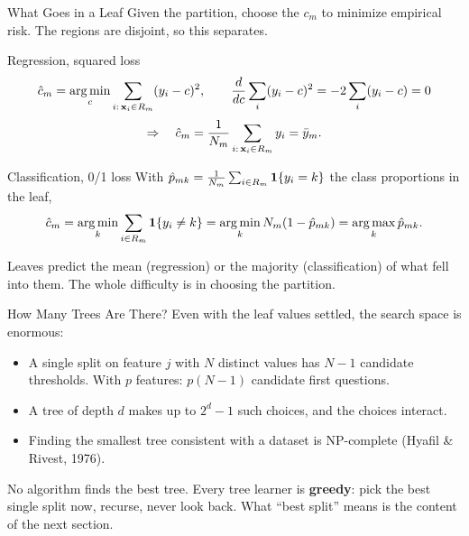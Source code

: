 \documentclass[11pt,aspectratio=169]{beamer}
\begin{document}
\begin{frame}{What Goes in a Leaf}\small
Given the partition, choose the $c_m$ to minimize empirical risk. The regions are disjoint, so this separates.
\begin{derivation}{Regression, squared loss}
\[
\hat c_m=\operatorname*{arg\,min}_c\sum_{i:\,\mathbf{x}_i\in R_m}(y_i-c)^2 ,\qquad
\frac{d}{dc}\sum_i(y_i-c)^2=-2\sum_i(y_i-c)=0
\]
\[
\Rightarrow\quad
\hat c_m=\frac{1}{N_m}\sum_{i:\,\mathbf{x}_i\in R_m}y_i=\bar y_m .
\]
\end{derivation}
\begin{derivation}{Classification, 0/1 loss}
With $\hat p_{mk}=\frac1{N_m}\sum_{i\in R_m}\mathbf{1}\!\left\{y_i=k\right\}$ the class proportions in the leaf,
\[
\hat c_m=\operatorname*{arg\,min}_k\sum_{i\in R_m}\mathbf{1}\!\left\{y_i\ne k\right\}=\operatorname*{arg\,min}_k N_m(1-\hat p_{mk})=\operatorname*{arg\,max}_k\hat p_{mk}.
\]
\end{derivation}
Leaves predict the mean (regression) or the majority (classification) of what fell into them.
The whole difficulty is in choosing the partition.
\end{frame}

\begin{frame}{How Many Trees Are There?}
Even with the leaf values settled, the search space is enormous:
\begin{itemize}
  \item A single split on feature $j$ with $N$ distinct values has $N-1$ candidate thresholds. With $p$ features:
        $p(N-1)$ candidate first questions.
  \item A tree of depth $d$ makes up to $2^d-1$ such choices, and the choices interact.
  \item Finding the smallest tree consistent with a dataset is NP-complete (Hyafil \& Rivest, 1976).
\end{itemize}
\vspace{6pt}
\begin{keypoint}
No algorithm finds the best tree. Every tree learner is \textbf{greedy}: pick the best single split now,
recurse, never look back. What ``best split'' means is the content of the next section.
\end{keypoint}
\end{frame}

\end{document}
